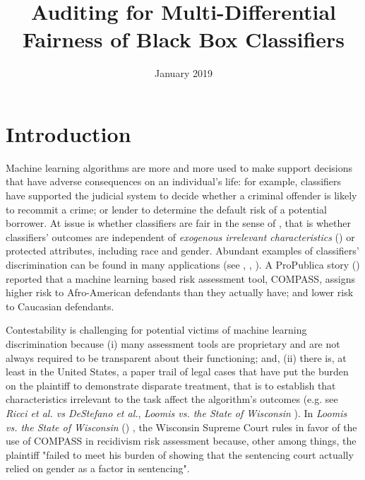 \documentclass{article}
\title{Auditing for Multi-Differential Fairness of Black Box Classifiers}
\author{}
\date{January 2019}
\begin{document}
\maketitle
\section{Introduction}
Machine learning algorithms are more and more used to make support decisions that have adverse consequences on an individual's life: for example, classifiers have supported the judicial system to decide whether a criminal offender is likely to recommit a crime; or lender to determine the default risk of a potential borrower. At issue is whether classifiers are fair in the sense of \cite{calsamiglia2009decentralizing} , that is whether classifiers' outcomes are independent of \textit{exogenous irrelevant characteristics} (\cite{calsamiglia2009decentralizing}) or protected attributes, including race and gender. Abundant examples of classifiers' discrimination can be found in many applications (see \cite{NY2017}, \cite{atlantic2016}, \cite{ProPublica2016}). A ProPublica story (\cite{ProPublica2016}) reported that a machine learning based risk assessment tool, COMPASS, assigns higher risk to Afro-American defendants than they actually have; and lower risk to Caucasian defendants.

\bigskip
Contestability is challenging for potential victims of machine learning discrimination because (i) many assessment tools are proprietary and are not always required to be transparent about their functioning; and, (ii) there is, at least in the United States, a paper trail of legal cases that have put the burden on the plaintiff to demonstrate disparate treatment, that is to establish that characteristics irrelevant to the task affect the algorithm's outcomes (e.g. see \textit{Ricci et al. vs DeStefano et al.}\cite{Ricci}, \textit{Loomis vs. the State of Wisconsin} \cite{Loomis}). In  \textit{Loomis vs. the State of Wisconsin} (\cite{Loomis}) , the Wisconsin Supreme Court rules in favor of the use of COMPASS in recidivism risk assessment because, other among things, the plaintiff "failed to meet his burden of showing that the sentencing court actually relied on gender as a factor in sentencing". 
	
\end{document}
